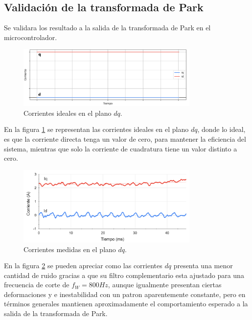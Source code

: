 \documentclass[11pt]{report}
\begin{document}
\subsection{Validación de la transformada de Park}

Se validara los resultado a la salida de la transformada de Park en el microcontrolador.

\begin{figure}[ht]
	\centering
	\includegraphics[width=0.8\textwidth]{imagenes/Corrientes_dq_ideal.png}
	\caption{Corrientes ideales en el plano $dq$.}
	\label{corrientes_dq_ideal}
\end{figure}
\FloatBarrier

En la figura \ref{corrientes_dq_ideal} se representan las corrientes ideales en el plano $dq$, donde lo ideal, es que la corriente directa tenga un valor de cero, para mantener la eficiencia del sistema, mientras que solo la corriente de cuadratura tiene un valor distinto a cero.

\begin{figure}[ht]
	\centering
	\includegraphics[width=0.8\textwidth]{imagenes/Corrientes_dq.png}
	\caption{Corrientes medidas en el plano $dq$.}
	\label{corrientes_dq}
\end{figure}
\FloatBarrier

En la figura \ref{corrientes_dq} se pueden apreciar como las corrientes $dq$ presenta una menor cantidad de ruido gracias a que su filtro complementario esta ajustado para una frecuencia de corte de $f_W=800Hz$, aunque igualmente presentan ciertas deformaciones y e inestabilidad con un patron aparentemente constante, pero en términos generales mantienen aproximadamente el comportamiento esperado a la salida de la transformada de Park.
\end{document}
